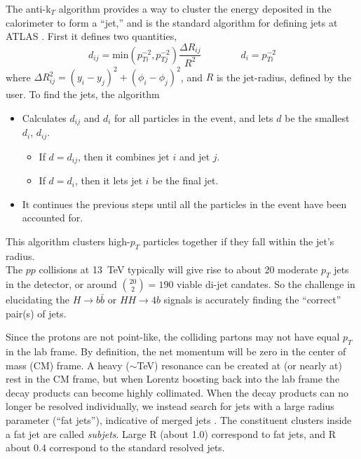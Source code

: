The anti-k$_T$ algorithm provides a way to cluster the energy deposited in the calorimeter to form a ``jet,'' and is the standard algorithm for defining jets at ATLAS \cite{antiKt}.  First it defines two quantities, 
%
\begin{equation}
d_{ij} = {\text{min}}( p_{Ti}^{-2}, p_{Tj}^{-2}) \frac{\Delta R_{ij}}{R^2} \qquad \qquad  d_i = p_{Ti}^{-2}
\end{equation}
%
where $\Delta R_{ij}^2 = (y_i - y_j)^2 + (\phi_i - \phi_j)^2$, and $R$ is the jet-radius, defined by the user.  To find the jets, the algorithm
%
\begin{itemize}
\item{Calculates $d_{ij}$ and $d_i$ for all particles in the event, and lets $d$ be the smallest $d_i$, $d_{ij}$.}
	\begin{itemize}
	\item{If $d = d_{ij}$, then it combines jet $i$ and jet $j$.}
	\item{If $d = d_{i}$, then it lets jet $i$ be the final jet.}
	\end{itemize}
\item{It continues the previous steps until all the particles in the event have been accounted for.}
\end{itemize}
%
This algorithm clusters high-$p_T$ particles together if they fall within the jet's radius. \\

The $pp$ collisions at 13~TeV typically will give rise to about 20 moderate $p_T$ jets in the detector, or around ${{20}\choose{2}} = 190$ viable di-jet candates.  So the challenge in elucidating the $H\rightarrow b\bar{b}$ or $HH \rightarrow 4b$ signals is accurately finding the ``correct'' pair(s) of jets.

Since the protons are not point-like, the colliding partons may not have equal $p_T$ in the lab frame. By definition, the net momentum will be zero in the center of mass (CM) frame.  A heavy ($\sim$TeV) resonance can be created at (or nearly at) rest in the CM frame, but when Lorentz boosting back into the lab frame the decay products can become highly collimated.  When the decay products can no longer be resolved individually, we instead search for jets with a large radius parameter (``fat jets''), indicative of merged jets \cite{SM_Higgs, Merged_Jets}.  The constituent clusters inside a fat jet are called \emph{subjets}.  
Large R (about 1.0) correspond to fat jets, and R about 0.4 correspond to the standard resolved jets.


